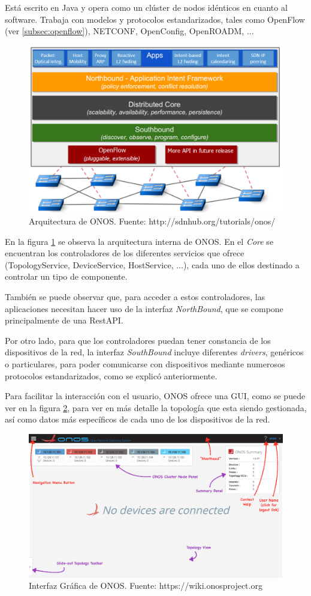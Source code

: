 Está escrito en Java y opera como un clúster de nodos idénticos en cuanto al software. Trabaja con modelos y protocolos estandarizados, tales como OpenFlow (ver \ref{subsec:openflow}), NETCONF, OpenConfig, OpenROADM, ...


\begin{figure}[!ht]
	\centering
	\includegraphics[width=0.6\linewidth]{imagenes/onos_architecture}
	\caption{Arquitectura de ONOS. 
		Fuente: http://sdnhub.org/tutorials/onos/}
	\label{fig:onosarch}
\end{figure}

En la figura \ref{fig:onosarch} se observa la arquitectura interna de ONOS. En el \textit{Core} se encuentran los controladores de los diferentes servicios que ofrece (TopologyService, DeviceService, HostService, ...), cada uno de ellos destinado a controlar un tipo de componente.

También se puede observar que, para acceder a estos controladores, las aplicaciones necesitan hacer uso de la interfaz \textit{NorthBound}, que se compone principalmente de una RestAPI.

Por otro lado, para que los controladores puedan tener constancia de los dispositivos de la red, la interfaz \textit{SouthBound} incluye diferentes \textit{drivers}, genéricos o particulares, para poder comunicarse con dispositivos mediante numerosos protocolos estandarizados, como se explicó anteriormente.

\clearpage

Para facilitar la interacción con el usuario, ONOS ofrece una GUI, como se puede ver en la figura \ref{fig:onosgui}, para ver en más detalle la topología que esta siendo gestionada, así como datos más específicos de cada uno de los dispositivos de la red. 

\begin{figure}[!ht]
	\centering
	\includegraphics[width=0.8\linewidth]{imagenes/onos_gui}
	\caption{Interfaz Gráfica de ONOS. 
		Fuente: https://wiki.onosproject.org}
	\label{fig:onosgui}
\end{figure}

